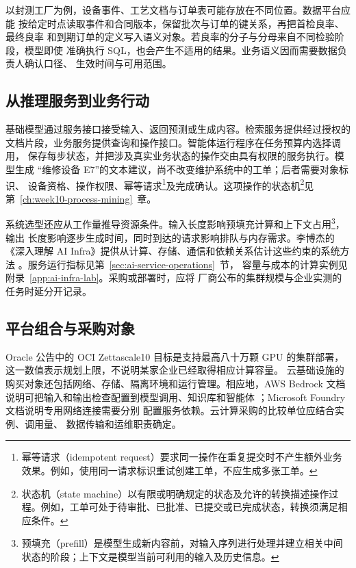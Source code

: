 以封测工厂为例，设备事件、工艺文档与订单表可能存放在不同位置。数据平台应能
按给定时点读取事件和合同版本，保留批次与订单的键关系，再把首检良率、最终良率
和到期订单的定义写入语义对象。若良率的分子与分母来自不同检验阶段，模型即使
准确执行 SQL，也会产生不适用的结果。业务语义因而需要数据负责人确认口径、
生效时间与可用范围。

\subsection{从推理服务到业务行动}
基础模型通过服务接口接受输入、返回预测或生成内容。检索服务提供经过授权的
文档片段，业务服务提供查询和操作接口。智能体运行程序在任务预算内选择调用，
保存每步状态，并把涉及真实业务状态的操作交由具有权限的服务执行。模型生成
“维修设备 E7”的文本建议，尚不改变维护系统中的工单；后者需要对象标识、
设备资格、操作权限、幂等请求\footnote{幂等请求（idempotent request）要求同一操作在重复提交时不产生额外业务效果。例如，使用同一请求标识重试创建工单，不应生成多张工单。}及完成确认。这项操作的状态机\footnote{状态机（state machine）以有限或明确规定的状态及允许的转换描述操作过程。例如，工单可处于待审批、已批准、已提交或已完成状态，转换须满足相应条件。}见第~\ref{ch:week10-process-mining}~章。

系统选型还应从工作量推导资源条件。输入长度影响预填充计算和上下文占用\footnote{预填充（prefill）是模型生成新内容前，对输入序列进行处理并建立相关中间状态的阶段；上下文是模型当前可利用的输入及历史信息。}，输出
长度影响逐步生成时间，同时到达的请求影响排队与内存需求。李博杰的《深入理解
AI Infra》提供从计算、存储、通信和依赖关系估计这些约束的系统方法
\cite{aiinfra2026}。服务运行指标见第~\ref{sec:ai-service-operations}~节，
容量与成本的计算实例见附录~\ref{app:ai-infra-lab}。采购或部署时，应将
厂商公布的集群规模与企业实测的任务时延分开记录。

\subsection{平台组合与采购对象}
Oracle 公告中的 OCI Zettascale10 目标是支持最高八十万颗 GPU 的集群部署，
这一数值表示规划上限，不说明某家企业已经取得相应计算容量\cite{oracleoci2025}。
云基础设施的购买对象还包括网络、存储、隔离环境和运行管理。相应地，AWS
Bedrock 文档说明可把输入和输出检查配置到模型调用、知识库和智能体
\cite{awsGuardrails2026}；Microsoft Foundry 文档说明专用网络连接需要分别
配置服务依赖\cite{azurePrivate2026}。云计算采购的比较单位应结合实例、调用量、
数据传输和运维职责确定。


